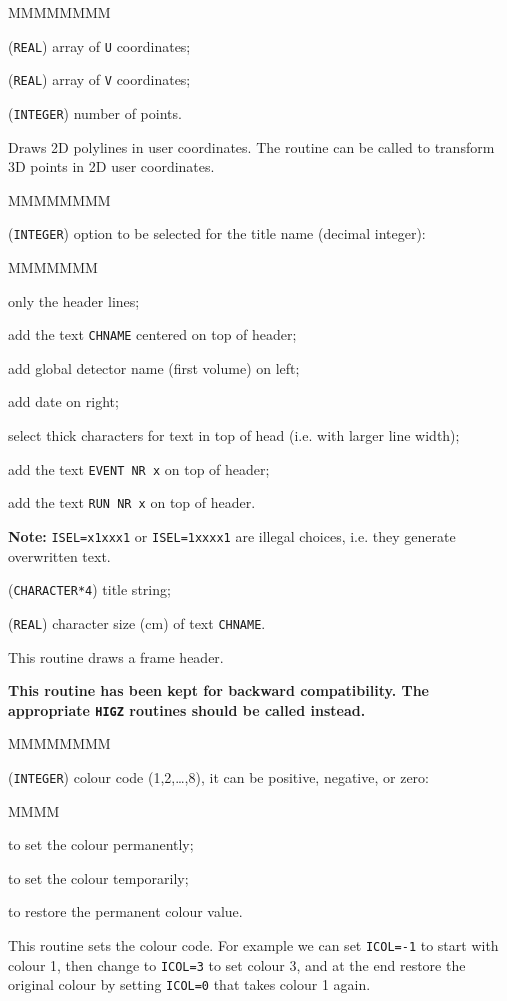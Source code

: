 \begin{DLtt}{MMMMMMMM}
\item[U]    ({\tt REAL}) array of {\tt U} coordinates;
\item[DT]   ({\tt REAL}) array of {\tt V} coordinates;
\item[NP]   ({\tt INTEGER}) number of points.
\end{DLtt}
Draws 2D polylines in user coordinates.
The routine  can be called to transform 3D points 
in 2D user coordinates.

\begin{DLtt}{MMMMMMMM}
\item[ISEL]  ({\tt INTEGER}) option to be selected for the title name 
(decimal integer):
\begin{DLtt}{MMMMMMM}
\item[~~~~~0] only the header lines;
\item[xxxxx1] add the text {\tt CHNAME} centered on top of header;
\item[xxxx1x] add global detector name (first volume) on left;
\item[xxx1xx] add date on right;
\item[xx1xxx] select thick characters for text in top of head (i.e. 
with larger line width);
\item[x1xxxx] add the text {\tt EVENT NR x} on top of header;
\item[1xxxxx] add the text {\tt RUN NR x} on top of header.
\end{DLtt}

{\bf Note:} {\tt ISEL=x1xxx1} or {\tt ISEL=1xxxx1} are illegal choices,
i.e. they generate overwritten text.
\item[CHNAME] ({\tt CHARACTER*4}) title string;
\item[CHRSIZ] ({\tt REAL}) character size (cm) of text {\tt CHNAME}.
\end{DLtt}
This routine draws a frame header.


{\bf This routine has been kept for backward compatibility. The appropriate
{\tt HIGZ} routines should be called instead.}

\begin{DLtt}{MMMMMMMM}
\item[ICOL] ({\tt INTEGER}) colour code (1,2,\ldots,8), 
it can be positive, negative, 
or zero:
\begin{DLtt}{MMMM}
\item[$>$0] to set the colour permanently;
\item[$<$0] to set the colour temporarily;
\item[$=$0] to restore the permanent colour value.
\end{DLtt}
\end{DLtt}
This routine sets the colour code.
For example we can set {\tt ICOL=-1} to start with colour  1,
then change to {\tt ICOL=3} to set colour  3, and at the end
restore the original colour by setting {\tt ICOL=0} that
takes colour  1 again.

